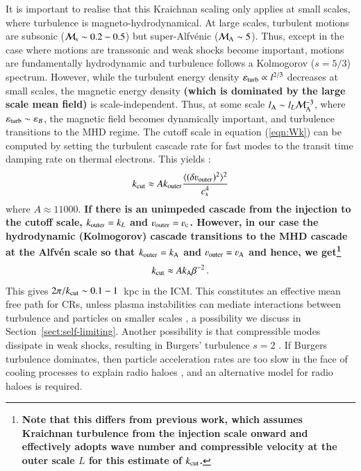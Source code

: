\documentclass[fleqn,usenatbib,useAMS]{mnras}
\newcommand\C[1]{{\bf #1}}
\newcommand{\eps}{\varepsilon}
\begin{document}
It is important to realise that this Kraichnan scaling only applies at small scales, where turbulence is magneto-hydrodynamical. At large scales, turbulent motions are subsonic (${\mathcal M}_{\rm s} \sim 0.2-0.5$) but super-Alfv{\'e}nic (${\mathcal M}_{\rm A} \sim 5$). Thus, except in the case where motions are transsonic and weak shocks become important, motions are fundamentally hydrodynamic and turbulence follows a Kolmogorov ($s=5/3$) spectrum. However, while the turbulent energy density $\eps_{\rm turb} \propto l^{2/3}$ decreases at small scales, the magnetic energy density \C{(which is dominated by the large scale mean field)} is scale-independent. Thus, at some scale $l_{\rm A} \sim l_L {\mathcal M}_{\rm A}^{-3}$, where $\eps_{\rm turb} \sim \eps_{B}$, the magnetic field becomes dynamically important, and turbulence transitions to the MHD regime. The cutoff scale in equation (\ref{eqn:Wk}) can be computed by setting the turbulent cascade rate for fast modes to the transit time damping rate on thermal electrons. This yields \citep{brunetti07,miniati15}:
\begin{equation}
k_{\rm cut} \approx A k_{\rmn{outer}} \frac{\langle (\delta \varv_{\rmn{outer}})^{2}\rangle^{2}}{c_{\rm s}^{4}}
\label{eqn:k_c1} 
\end{equation}
where $A \approx 11 000$. \C{If there is an unimpeded cascade from the injection to the cutoff scale, $k_{{\mathrm{outer}}}=k_L$ and $\varv_{\rmn{outer}}=\varv_{\rmn{c}}$. However, in our case the hydrodynamic (Kolmogorov) cascade transitions to the MHD cascade at the Alfv{\'e}n scale so that $k_{{\mathrm{outer}}}=k_{{\mathrm{A}}}$ and $\varv_{\rmn{outer}}=\varv_{\rmn{A}}$ and hence, we get\footnote{\C{Note that this differs from previous work, which assumes Kraichnan turbulence from the injection scale onward and effectively adopts wave number and compressible velocity at the outer scale $L$ for this estimate of $k_{\rm cut}$.}}
\begin{equation}
k_{\rm cut} \approx A k_{{\mathrm{A}}} \beta^{-2}\,.
\label{eqn:k_c} 
\end{equation}
}
This gives $2\pi/k_{\mathrm{cut}}\sim 0.1-1$~kpc in the ICM. This constitutes an
effective mean free path for CRs, unless plasma instabilities can
mediate interactions between turbulence and particles on smaller
scales \citep{brunetti11}, a possibility we discuss in Section~\ref{sect:self-limiting}. Another possibility is that compressible modes dissipate in weak shocks, resulting in Burgers' turbulence $s=2$ \citep{kowal10,porter15,miniati15}. If Burgers turbulence dominates, then particle acceleration rates are too slow in the face of cooling processes to explain radio haloes \citep{miniati15}, and an alternative model for radio haloes is required. 
\end{document}
